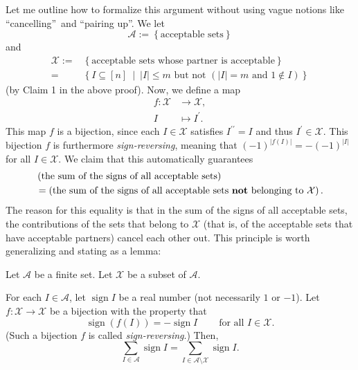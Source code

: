 Let me outline how to formalize this argument without using vague notions like
\textquotedblleft cancelling\textquotedblright\ and \textquotedblleft pairing
up\textquotedblright. We let%
\[
\mathcal{A}:=\left\{  \text{acceptable sets}\right\}
\]
and%
\begin{align*}
\mathcal{X}:=  &  \left\{  \text{acceptable sets whose partner is
acceptable}\right\} \\
=  &  \left\{  I\subseteq\left[  n\right]  \ \mid\ \left\vert I\right\vert
\leq m\text{ but not }\left(  \left\vert I\right\vert =m\text{ and }1\notin
I\right)  \right\}
\end{align*}
(by Claim 1 in the above proof). Now, we define a map%
\begin{align*}
f:\mathcal{X}  &  \rightarrow\mathcal{X},\\
I  &  \mapsto I^{\prime}.
\end{align*}
This map $f$ is a bijection, since each $I\in\mathcal{X}$ satisfies
$I^{\prime\prime}=I$ and thus $I^{\prime}\in\mathcal{X}$. This bijection $f$
is furthermore \emph{sign-reversing}, meaning that $\left(  -1\right)
^{\left\vert f\left(  I\right)  \right\vert }=-\left(  -1\right)  ^{\left\vert
I\right\vert }$ for all $I\in\mathcal{X}$. We claim that this automatically
guarantees%
\begin{align*}
&  \left(  \text{the sum of the signs of all acceptable sets}\right) \\
&  =\left(  \text{the sum of the signs of all acceptable sets \textbf{not}
belonging to }\mathcal{X}\right)  .
\end{align*}
The reason for this equality is that in the sum of the signs of all acceptable
sets, the contributions of the sets that belong to $\mathcal{X}$ (that is, of
the acceptable sets that have acceptable partners) cancel each other out. This
principle is worth generalizing and stating as a lemma:

\begin{lemma}
\label{lem.sign.cancel1}Let $\mathcal{A}$ be a
finite set. Let $\mathcal{X}$ be a subset of $\mathcal{A}$.

For each $I\in\mathcal{A}$, let $\operatorname*{sign}I$ be a real number (not
necessarily $1$ or $-1$). Let $f:\mathcal{X}\rightarrow\mathcal{X}$ be a
bijection with the property that%
\begin{equation}
\operatorname*{sign}\left(  f\left(  I\right)  \right)  =-\operatorname*{sign}%
I\ \ \ \ \ \ \ \ \ \ \text{for all }I\in\mathcal{X}.
\label{eq.lem.sign.cancel1.sr}%
\end{equation}
(Such a bijection $f$ is called \emph{sign-reversing}.) Then,%
\[
\sum_{I\in\mathcal{A}}\operatorname*{sign}I=\sum_{I\in\mathcal{A}%
\setminus\mathcal{X}}\operatorname*{sign}I.
\]

\end{lemma}

